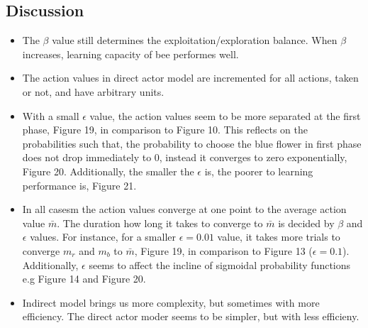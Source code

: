 \documentclass{article}
\begin{document}
\subsection{Discussion}
\begin{itemize}
 \item The $\beta$ value still determines the exploitation/exploration balance. When $\beta$ increases, learning capacity of bee performes well.
\item The action values in direct actor model are incremented for all actions, taken or not, and have arbitrary units. 
\item With a small $\epsilon$ value, the action values seem to be more separated at the first phase, Figure 19, in comparison to Figure 10. This reflects on the probabilities such that, the probability to choose the blue flower in first phase does not drop immediately to 0, instead it converges to zero exponentially, Figure 20. Additionally, the smaller the $\epsilon$ is, the poorer to learning performance is, Figure 21.
\item In all casesm the action values converge at one point to the average action value ${\bar m}$. The duration how long it takes to converge to ${\bar m}$ is decided by $\beta$ and $\epsilon$ values. For instance, for a smaller $\epsilon=0.01$ value, it takes more trials to converge $m_r$ and $m_b$ to ${\bar m}$, Figure 19, in comparison to Figure 13 ($\epsilon=0.1$). Additionally, $\epsilon$ seems to affect the incline of sigmoidal probability functions e.g Figure 14 and Figure 20.
\item Indirect model brings us more complexity, but sometimes with more efficiency. The direct actor moder seems to be simpler, but with less efficieny. 
\end{itemize}
\end{document}
